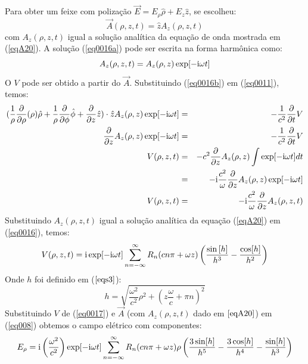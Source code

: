 Para obter um feixe com poliza\c{c}\~ao $\vec{E}=E_{\rho}\hat{\rho}+E_{z}\hat{z}$, se escolheu:
\begin{equation}\label{eq0016a}
 \vec{A}(\rho,z,t)=\hat{z}A_z(\rho,z,t)
\end{equation}
com $A_z(\rho,z,t)$ igual a solu\c{c}\~ao anal\'itica da equa\c{c}\~ao de onda mostrada em (\ref{eqA20}). A solu\c{c}\~ao (\ref{eq0016a}) pode ser escrita na forma harm\^onica como:
\begin{equation}\label{eq0016b}
A_z(\rho,z,t)=A_z(\rho,z)\exp[-{\rm i}\omega t] 
\end{equation}
O $V$ pode ser obtido a partir do $\vec{A}$. Substituindo (\ref{eq0016b}) em (\ref{eq0011}), temos:
\begin{eqnarray}
 (\frac{1}{\rho}\frac{\partial}{\partial \rho}(\rho)\hat{\rho}+\frac{1}{\rho}\frac{\partial}{\partial\phi}\hat{\phi}+\frac{\partial}{\partial z}\hat{z})\cdot \hat{z}A_z(\rho,z)\exp[-{\rm i}\omega t] & = & -\frac{1}{c^2}\frac{\partial}{\partial t} V \nonumber\\
 \frac{\partial }{\partial z} A_z(\rho,z)\exp[-{\rm i}\omega t] & = &  -\frac{1}{c^2}\frac{\partial}{\partial t} V \nonumber\\
   V(\rho,z,t)& = & -c^2\frac{\partial }{\partial z}A_z(\rho,z)\int\exp[-{\rm i}\omega t] dt \nonumber\\
 &=& -{\rm i}\frac{c^2}{\omega} \frac{\partial }{\partial z} A_z(\rho,z)\exp[-{\rm i}\omega t]\nonumber\\
 V(\rho,z,t)&=&  -{\rm i}\frac{c^2}{\omega} \frac{\partial }{\partial z}A_z(\rho,z,t)
\label{eq0016}
\end{eqnarray}
Substituindo $A_z(\rho,z,t)$ igual a solu\c{c}\~ao anal\'itica da equa\c{c}\~ao (\ref{eqA20}) em (\ref{eq0016}), temos:
\begin{equation}\label{eq0017}
 V(\rho,z,t)= {\rm i}\exp[-{\rm i}\omega t]\sum\limits_{n=-\infty}^{\infty}R_n  (c n \pi +\omega z )  \left(\frac{\sin\left[h\right]}{h^3}-\frac{\cos[h]}{h^2}\right)
\end{equation}
Onde $h$ foi definido em ($\ref{eqs3}$):
$$ h = \sqrt{\frac{\omega^2}{c^2}\rho^2+(z\frac{\omega}{c}+\pi n)^2} $$
Substituindo $V$ de (\ref{eq0017}) e $\vec{A}$ (com $A_z(\rho,z,t)$ dado em $\ref{eqA20}$) em (\ref{eq008}) obtemos o campo el\'etrico com componentes:
\begin{equation}\label{eq0020}
E_{\rho}= {\rm i}\left(\frac{\omega^2}{c^2}\right)\exp[-{\rm i}\omega t]\sum\limits_{n=-\infty}^{\infty}R_n(c n \pi +\omega z) \rho  \left(\frac{3 \sin[h]}{ h^5} -\frac{3\cos[h]}{ h^4}-\frac{\sin[h]}{h^3}\right) 
\end{equation}
